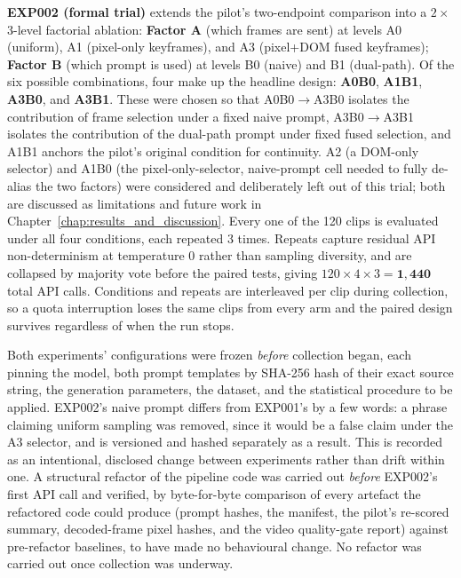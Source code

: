 \textbf{EXP002 (formal trial)} extends the pilot's two-endpoint comparison into a $2\times$3-level factorial ablation: \textbf{Factor A} (which frames are sent) at levels A0 (uniform), A1 (pixel-only keyframes), and A3 (pixel+DOM fused keyframes); \textbf{Factor B} (which prompt is used) at levels B0 (naive) and B1 (dual-path). Of the six possible combinations, four make up the headline design: \textbf{A0B0}, \textbf{A1B1}, \textbf{A3B0}, and \textbf{A3B1}. These were chosen so that A0B0$\to$A3B0 isolates the contribution of frame selection under a fixed naive prompt, A3B0$\to$A3B1 isolates the contribution of the dual-path prompt under fixed fused selection, and A1B1 anchors the pilot's original condition for continuity. A2 (a DOM-only selector) and A1B0 (the pixel-only-selector, naive-prompt cell needed to fully de-alias the two factors) were considered and deliberately left out of this trial; both are discussed as limitations and future work in Chapter~\ref{chap:results_and_discussion}. Every one of the 120 clips is evaluated under all four conditions, each repeated 3 times. Repeats capture residual API non-determinism at temperature 0 rather than sampling diversity, and are collapsed by majority vote before the paired tests, giving $120 \times 4 \times 3 = \mathbf{1{,}440}$ total API calls. Conditions and repeats are interleaved per clip during collection, so a quota interruption loses the same clips from every arm and the paired design survives regardless of when the run stops.

Both experiments' configurations were frozen \emph{before} collection began, each pinning the model, both prompt templates by SHA-256 hash of their exact source string, the generation parameters, the dataset, and the statistical procedure to be applied. EXP002's naive prompt differs from EXP001's by a few words: a phrase claiming uniform sampling was removed, since it would be a false claim under the A3 selector, and is versioned and hashed separately as a result. This is recorded as an intentional, disclosed change between experiments rather than drift within one. A structural refactor of the pipeline code was carried out \emph{before} EXP002's first API call and verified, by byte-for-byte comparison of every artefact the refactored code could produce (prompt hashes, the manifest, the pilot's re-scored summary, decoded-frame pixel hashes, and the video quality-gate report) against pre-refactor baselines, to have made no behavioural change. No refactor was carried out once collection was underway.

